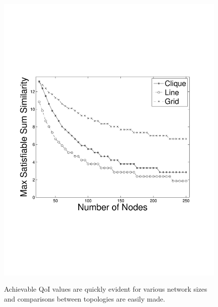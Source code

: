 \begin{figure}[ht]
{	\includegraphics[scale=0.31, clip=true, trim=15mm 65mm 20mm 65mm]{figures/use_cases_examples/sum_sim_vs_num_nodes_50_T_12_IS_2_W.pdf}
	\label{fig:use_case_sum_sim_vs_num_nodes}
	}
\caption{Achievable QoI values are quickly evident for various network sizes and comparisons between topologies are easily made.}
\vspace{-2mm}
\end{figure}

%

